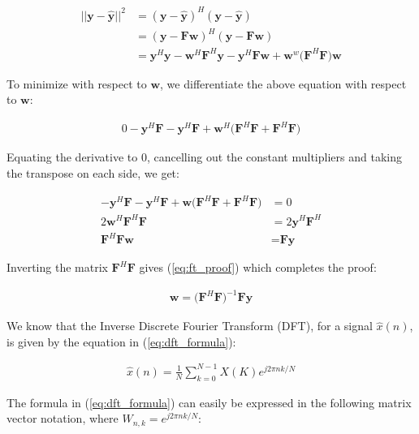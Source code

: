 \begin{align*}
||\textbf{y}-\hat{\textbf{y}}||^2 &= (\textbf{y}-\hat{\textbf{y}})^H(\textbf{y}-\hat{\textbf{y}}) \\
&= (\textbf{y}-\textbf{F}\textbf{w})^H(\textbf{y}-\textbf{F}\textbf{w}) \\
&= \textbf{y}^H\textbf{y} - \textbf{w}^H\textbf{F}^H\textbf{y} - \textbf{y}^H\textbf{F}\textbf{w} + \textbf{w}^w\big(\textbf{F}^H\textbf{F}\big)\textbf{w}
\end{align*}

\noindent{}To minimize with respect to $\textbf{w}$, we differentiate the above equation with respect to $\textbf{w}$:

\begin{align*}
0 -\textbf{y}^H\textbf{F} - \textbf{y}^H\textbf{F} + \textbf{w}^H\big(\textbf{F}^H\textbf{F}+\textbf{F}^H\textbf{F}\big)
\end{align*}

\noindent{}Equating the derivative to 0, cancelling out the constant multipliers and taking the transpose on each side, we get:

\begin{align*}
-\textbf{y}^H\textbf{F} - \textbf{y}^H\textbf{F} + \textbf{w}\big(\textbf{F}^H\textbf{F}+\textbf{F}^H\textbf{F}\big) &= 0 \\
2 \textbf{w}^H\textbf{F}^H\textbf{F} &= 2\textbf{y}^H\textbf{F}^H\\
\textbf{F}^H\textbf{F} \textbf{w} &= \textbf{F}\textbf{y}
\end{align*}

\noindent{}Inverting the matrix $\textbf{F}^H\textbf{F}$ gives (\ref{eq:ft_proof}) which completes the proof:

\begin{align}
\textbf{w} = \big(\textbf{F}^H\textbf{F}\big)^{-1} \textbf{F}\textbf{y} \label{eq:ft_proof}
\end{align}

\noindent{}We know that the Inverse Discrete Fourier Transform (DFT), for a signal $\hat{x}(n)$, is given by the equation in (\ref{eq:dft_formula}):

\begin{align}
\hat{x}(n) = \frac{1}{N} \sum_{k=0}^{N-1}X(K)e^{j2\pi n k / N} \label{eq:dft_formula}
\end{align}

\noindent{}The formula in (\ref{eq:dft_formula}) can easily be expressed in the following matrix vector notation, where $W_{n,k}=e^{j2\pi n k / N}$:

